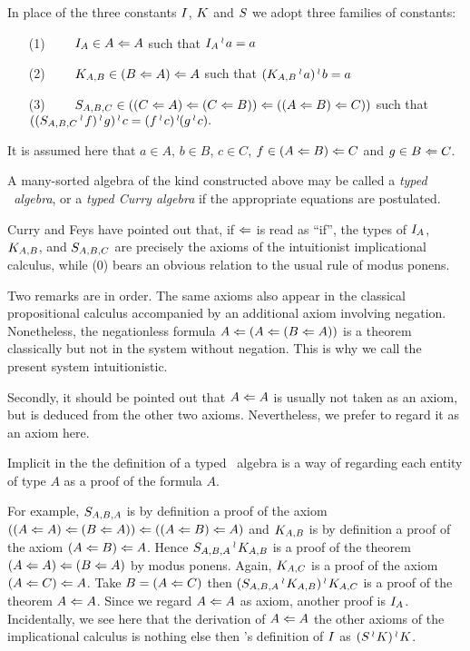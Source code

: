 In place of the three constants ${I}$, ${K}$ and ${S}$ we adopt three families of constants:
\begin{enumerate}[align=left]
\item[(1)]$\qquad {I}_{A} \in A \Leftarrow A$ such that ${I}_{A} \mathop{{}^\wr}\kern-.8pt a = a$
\item[(2)]$\qquad {K}_{A,B} \in (B \Leftarrow A) \Leftarrow A$ such that $({K}_{A,B}\mathop{{}^\wr}\kern-.8pt a)\mathop{{}^\wr}\kern-.8pt b = a$
\item[(3)]$\qquad {S}_{A,B,C} \in ((C \Leftarrow A) \Leftarrow (C \Leftarrow B)) \Leftarrow ((A \Leftarrow B) \Leftarrow C))$ such that
$(({S}_{A,B,C} \mathop{{}^\wr}\kern-.8pt f) \mathop{{}^\wr}\kern-.8pt g) \mathop{{}^\wr}\kern-.8pt c = (f \mathop{{}^\wr}\kern-.8pt c) \mathop{{}^\wr}\kern-.8pt (g \mathop{{}^\wr}\kern-.8pt c).$
\end{enumerate}
It is assumed here that $a\in A$, $b \in B$, $c\in C$, $f \in (A \Leftarrow B) \Leftarrow C$ and $g \in B \Leftarrow C$.

A many-sorted algebra of the kind constructed above
may be called a {\it typed \schon\ algebra}, or a {\it typed Curry algebra} if the appropriate
equations are postulated.

Curry and Feys have pointed out that, if $\Leftarrow$ is read as ``if'',
the types of ${I}_{A}$, ${K}_{A,B}$, and ${S}_{A,B,C}$ are precisely the axioms of the
intuitionist implicational calculus, while (0) bears an obvious relation to
the usual rule of modus ponens.

Two remarks are in order. The same axioms also appear in the classical
propositional calculus accompanied by an additional axiom involving negation.
Nonetheless, the negationless formula $A \Leftarrow (A \Leftarrow (B \Leftarrow A))$ is a
theorem classically but not in the system without negation.
This is why we call the present system intuitionistic.

Secondly, it should be pointed out that $A \Leftarrow A$ is usually not
taken as an axiom, but is deduced from the other two axioms. Nevertheless,
we prefer to regard it as an axiom here.

Implicit in the the definition of a typed \schon\ algebra
is a way of regarding each entity of type $A$ as a proof of the
formula $A$.

For example, ${S}_{A,B,A}$ is by definition a proof of the axiom
$((A \Leftarrow A)\Leftarrow(B\Leftarrow A))\Leftarrow((A\Leftarrow B)\Leftarrow A)$
and ${K}_{A,B}$ is by definition a proof of the axiom $(A \Leftarrow B) \Leftarrow A$.
Hence ${S}_{A,B,A} \mathop{{}^\wr}\kern-.8pt {K}_{A,B}$ is a proof of the theorem $(A\Leftarrow A) \Leftarrow (B\Leftarrow A)$
by modus ponens. Again, ${K}_{A,C}$ is a proof of the axiom
$(A \Leftarrow C) \Leftarrow A$. Take $B = (A \Leftarrow C)$
then $({S}_{A,B,A}\mathop{{}^\wr}\kern-.8pt {K}_{A,B})\mathop{{}^\wr}\kern-.8pt {K}_{A,C}$ is a proof of the theorem $A \Leftarrow A$.
Since we regard $A\Leftarrow A$ as axiom, another proof is ${I}_{A}$. Incidentally,
we see here that the derivation of $A \Leftarrow A$ the other axioms of the
implicational calculus is nothing else then \schon's
definition of ${I}$ as $({S} \mathop{{}^\wr}\kern-.8pt {K})\mathop{{}^\wr}\kern-.8pt {K}$.

